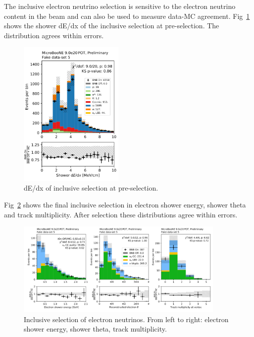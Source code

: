 The inclusive electron neutrino selection is sensitive to the electron neutrino content in the beam and can also be used to measure data-MC agreement.  Fig~\ref{fig:fakedata:set5:inc_presel} shows the shower dE/dx of the inclusive selection at pre-selection.  The distribution agrees within errors.   

\begin{figure}[H]
\begin{center}
\includegraphics[width=0.45\textwidth]{Fakedata/set5/inc_presel.pdf}
\caption{\label{fig:fakedata:set5:inc_presel} dE/dx of inclusive selection at pre-selection.}
\end{center}
\end{figure}

Fig~\ref{fig:fakedata:set5:inc_postsel} shows the final inclusive selection in electron shower energy, shower theta and track multiplicity.  After selection these distributions agree within errors.

\begin{figure}[H]
\begin{center}
\includegraphics[width=0.9\textwidth]{Fakedata/set5/incl_postsel.pdf}
\caption{\label{fig:fakedata:set5:inc_postsel} Inclusive selection of electron neutrinos. From left to right: electron shower energy, shower theta, track multiplicity.}
\end{center}
\end{figure}

